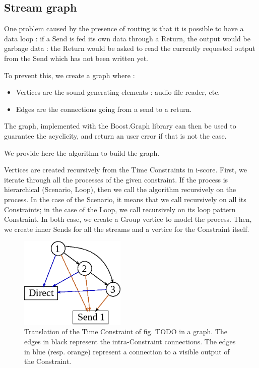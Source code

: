 \documentclass{article}
\begin{document}
\subsection{Stream graph}
One problem caused by the presence of routing is that it is possible 
to have a data loop : if a Send is fed its own data through a Return, 
the output would be garbage data : the Return would be asked to read 
the currently requested output from the Send which has not been written yet.

To prevent this, we create a graph where : 
\begin{itemize}
	\item Vertices are the sound generating elements : audio file reader, etc.
	\item Edges are the connections going from a send to a return.
\end{itemize} 

The graph, implemented with the Boost.Graph library can then be used to 
guarantee the acyclicity, and return an user error if that is not the case.

We provide here the algorithm to build the graph.

Vertices are created recursively from the Time Constraints in i-score.
First, we iterate through all the processes of the given constraint.
If the process is hierarchical (Scenario, Loop), then we call the algorithm recursively on the process.
In the case of the Scenario, it means that we call recursively on all its Constraints; in the case of the Loop, we call recursively on its loop pattern Constraint.
In both case, we create a Group vertice to model the process.
Then, we create inner Sends for all the streams and a vertice for the Constraint itself.

\begin{figure}
	\includegraphics[width=0.45\textwidth]{figures/graph1.eps}
	\caption{Translation of the Time Constraint of fig. TODO in a graph.
		The edges in black represent the intra-Constraint connections. 
		The edges in blue (resp. orange) represent a connection to a visible output of 
		the Constraint.}
\end{figure}
\end{document}
